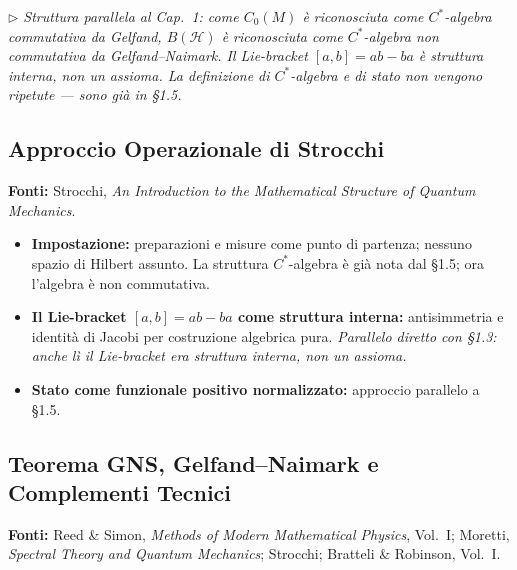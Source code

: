 \documentclass[12pt, a4paper]{article}
\newcommand{\fonti}[1]{%
	\begin{fontebox}
		\textcolor{fontecolor}{\footnotesize\textbf{Fonti:} #1}
	\end{fontebox}%
}
\newcommand{\nota}[1]{%
	\par\smallskip
	\noindent\textit{\small $\triangleright$\; #1}
	\par\smallskip
}
\begin{document}
	\nota{Struttura parallela al Cap.~1: come $C_0(M)$ è riconosciuta come $C^*$-algebra
		commutativa da Gelfand, $B(\mathcal{H})$ è riconosciuta come $C^*$-algebra non
		commutativa da Gelfand--Naimark. Il Lie-bracket $[a,b]=ab-ba$ è struttura interna,
		non un assioma. La definizione di $C^*$-algebra e di stato non vengono ripetute ---
		sono già in \S1.5.}
	
	\subsection{Approccio Operazionale di Strocchi}
	
	\fonti{Strocchi, \textit{An Introduction to the Mathematical Structure of Quantum
			Mechanics}.}
	
	\begin{itemize}
		\item \textbf{Impostazione:} preparazioni e misure come punto di partenza; nessuno
		spazio di Hilbert assunto. La struttura $C^*$-algebra è già nota dal \S1.5; ora
		l'algebra è non commutativa.
		\item \textbf{Il Lie-bracket $[a,b]=ab-ba$ come struttura interna:} antisimmetria
		e identità di Jacobi per costruzione algebrica pura. \emph{Parallelo diretto con
			\S1.3: anche lì il Lie-bracket era struttura interna, non un assioma.}
		\item \textbf{Stato come funzionale positivo normalizzato:} approccio parallelo
		a \S1.5.
	\end{itemize}
	
	\subsection{Teorema GNS, Gelfand--Naimark e Complementi Tecnici}
	
	\fonti{Reed \& Simon, \textit{Methods of Modern Mathematical Physics}, Vol.~I;
		Moretti, \textit{Spectral Theory and Quantum Mechanics}; Strocchi;
		Bratteli \& Robinson, Vol.~I.}
	
\end{document}
